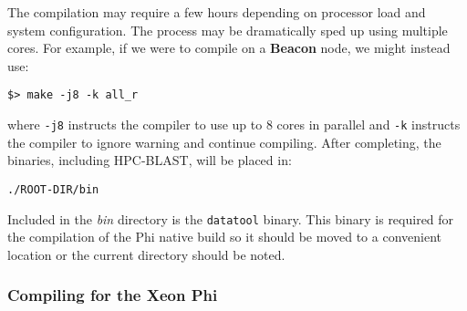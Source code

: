 \documentclass[10pt]{article}
\newcommand{\beac}{\textbf{Beacon }}
\begin{document}
\noindent The compilation may require a few hours depending on processor load and system configuration.  The process may be dramatically sped up using multiple cores.  For example, if we were to compile on a \beac node, we might instead use:
\begin{verbatim}
$> make -j8 -k all_r 
\end{verbatim}
\noindent where \verb^-j8^ instructs the compiler to use up to 8 cores in parallel and \verb^-k^ instructs the compiler to ignore warning and continue compiling.  After completing, the binaries, including HPC-BLAST, will be placed in:
\begin{verbatim}
./ROOT-DIR/bin
\end{verbatim}
\noindent Included in the \emph{bin} directory is the \verb^datatool^ binary.  This binary is required for the compilation of the Phi native build so it should be moved to a convenient location or the current directory should be noted.

\subsubsection{Compiling for the Xeon Phi} \label{sssec:ncbi-phi}
\end{document}
